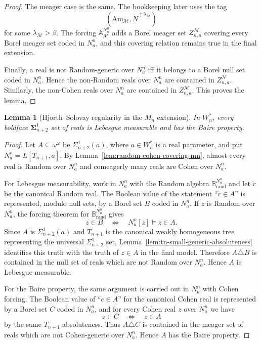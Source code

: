 \documentclass[a4paper,11pt]{article}
\newtheorem{lemma}[theorem]{Lemma}
\begin{document}
\begin{proof}
The meager case is the same.  The bookkeeping later uses the tag
\[
   (\mathrm{Am}_{\mathcal M},\dot N^{\uparrow\lambda_{\mathcal M}})
\]
for some \(\lambda_{\mathcal M}>\beta\).  The forcing
\(\mathbb A_{\mathcal M}^{N^n_a}\) adds a Borel meager set
\(Z^{\mathcal M}_{n,a}\) covering every Borel meager set coded in \(N^n_a\),
and this covering relation remains true in the final extension.

Finally, a real is not Random-generic over \(N^n_a\) iff it belongs to a Borel
null set coded in \(N^n_a\).  Hence the non-Random reals over \(N^n_a\) are
contained in \(Z^{\mathcal N}_{n,a}\).  Similarly, the non-Cohen reals over
\(N^n_a\) are contained in \(Z^{\mathcal M}_{n,a}\).  This proves the lemma.
\end{proof}

\begin{lemma}[Hjorth--Solovay regularity in the $M_n$ extension]\label{lem:sigma-n2-regularity-mn}
In $W_n^\ast$, every boldface $\boldsymbol\Sigma^1_{n+2}$ set of reals is Lebesgue measurable and has the Baire property.
\end{lemma}

\begin{proof}
Let $A\subseteq\omega^\omega$ be $\Sigma^1_{n+2}(a)$, where $a\in W_n^\ast$ is a real parameter, and put $N^n_a=L[T_{n+1},a]$.  By Lemma~\ref{lem:random-cohen-covering-mn}, almost every real is Random over $N^n_a$ and comeagerly many reals are Cohen over $N^n_a$.

For Lebesgue measurability, work in $N^n_a$ with the Random algebra $\mathbb B_{\mathrm{rand}}^{N^n_a}$ and let $\dot r$ be the canonical Random real.  The Boolean value of the statement ``$\dot r\in A$'' is represented, modulo null sets, by a Borel set $B$ coded in $N^n_a$.  If $z$ is Random over $N^n_a$, the forcing theorem for $\mathbb B_{\mathrm{rand}}^{N^n_a}$ gives
\[
   z\in B
   \quad\Longleftrightarrow\quad
   N^n_a[z]\models z\in A.
\]
Since $A$ is $\Sigma^1_{n+2}(a)$ and $T_{n+1}$ is the canonical weakly homogeneous tree representing the universal $\Sigma^1_{n+2}$ set, Lemma~\ref{lem:tn-small-generic-absoluteness} identifies this truth with the truth of $z\in A$ in the final model.  Therefore $A\triangle B$ is contained in the null set of reals which are not Random over $N^n_a$.  Hence $A$ is Lebesgue measurable.

For the Baire property, the same argument is carried out in $N^n_a$ with Cohen forcing.  The Boolean value of ``$\dot c\in A$'' for the canonical Cohen real is represented by a Borel set $C$ coded in $N^n_a$, and for every Cohen real $z$ over $N^n_a$ we have
\[
   z\in C
   \quad\Longleftrightarrow\quad
   z\in A
\]
by the same $T_{n+1}$ absoluteness.  Thus $A\triangle C$ is contained in the meager set of reals which are not Cohen-generic over $N^n_a$.  Hence $A$ has the Baire property.
\end{proof}
\end{document}
